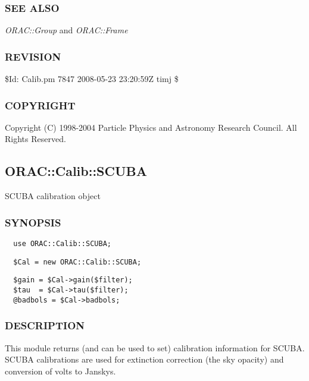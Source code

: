 \subsubsection*{SEE ALSO\label{ORAC::Calib_SEE_ALSO}}


\emph{ORAC::Group} and
\emph{ORAC::Frame}

\subsubsection*{REVISION\label{ORAC::Calib_REVISION}}


\$Id: Calib.pm 7847 2008-05-23 23:20:59Z timj \$

\subsubsection*{COPYRIGHT\label{ORAC::Calib_COPYRIGHT}}


Copyright (C) 1998-2004 Particle Physics and Astronomy Research
Council. All Rights Reserved.

\subsection{ORAC::Calib::SCUBA\label{ORAC::Calib::SCUBA}}


SCUBA calibration object

\subsubsection*{SYNOPSIS\label{ORAC::Calib::SCUBA_SYNOPSIS}}
\begin{verbatim}
  use ORAC::Calib::SCUBA;
\end{verbatim}
\begin{verbatim}
  $Cal = new ORAC::Calib::SCUBA;
\end{verbatim}
\begin{verbatim}
  $gain = $Cal->gain($filter);
  $tau  = $Cal->tau($filter);
  @badbols = $Cal->badbols;
\end{verbatim}
\subsubsection*{DESCRIPTION\label{ORAC::Calib::SCUBA_DESCRIPTION}}


This module returns (and can be used to set) calibration information
for SCUBA. SCUBA calibrations are used for extinction correction
(the sky opacity) and conversion of volts to Janskys.



